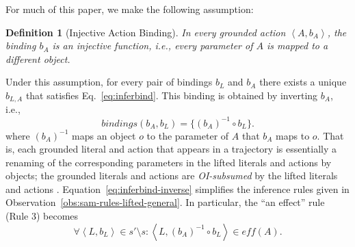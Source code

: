 \documentclass{article}
\newtheorem{observation}{Observation}
\newtheorem{definition}{Definition}
\newcommand{\tuple}[1]{\ensuremath{\left \langle #1 \right \rangle }}
\newcommand{\pre}{\textit{pre}}
\newcommand{\eff}{\textit{eff}}
\newcommand{\liftl}{L}
\newcommand{\lifta}{A}
\newcommand{\bindings}{\textit{bindings}}
\begin{document}
\noindent
For much of this paper, we make the following assumption:
\begin{definition}[Injective Action Binding]
In every grounded action $\tuple{\lifta, b_\lifta}$, the binding $b_\lifta$ is an injective function, 
i.e., every parameter of $\lifta$ is mapped to a different object. 
\label{def:injective}
\end{definition}
Under this assumption, for every pair of bindings $b_\liftl$ and $b_\lifta$ 
there exists a unique $b_{\liftl,\lifta}$ that satisfies Eq.~\ref{eq:inferbind}. 
This binding is obtained by inverting $b_\lifta$, i.e., 
\begin{equation}
    \bindings(b_\lifta, b_\liftl) = \{ (b_\lifta)^{-1}\circ b_\liftl \}.
    \label{eq:inferbind-inverse}
\end{equation}
where $(b_\lifta)^{-1}$ maps an object $o$ to the parameter of $\lifta$ that $b_\lifta$ maps to $o$. %
That is, each grounded literal and action that appears in a trajectory is essentially a renaming of the corresponding parameters in the lifted literals and actions by objects; the grounded literals and actions are \emph{OI-subsumed} by the lifted literals and actions \cite[Section 5.5.1]{deraedt08}.
Equation~\ref{eq:inferbind-inverse} simplifies the inference rules given in Observation~\ref{obs:sam-rules-lifted-general}. 
In particular, the ``an effect'' rule (Rule 3) becomes
\begin{equation}
    \forall \tuple{\liftl,b_\liftl} \in s'\setminus s: 
     \tuple{\liftl,(b_\lifta)^{-1}\circ b_\liftl} \in \eff(\lifta).
\end{equation}
    

\end{document}
